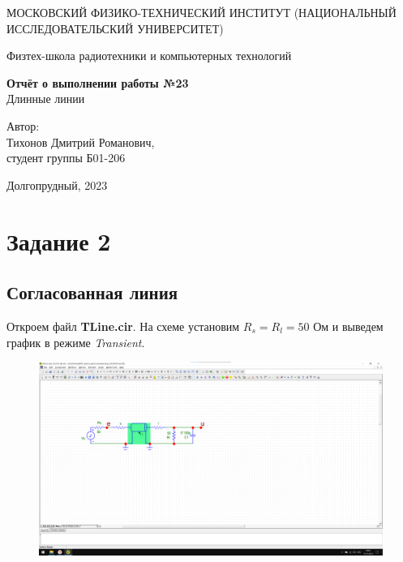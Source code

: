 \documentclass[a4paper, 12pt]{article}
\begin{document}
    \begin{titlepage}
	\begin{center}
            {\large МОСКОВСКИЙ ФИЗИКО-ТЕХНИЧЕСКИЙ ИНСТИТУТ (НАЦИОНАЛЬНЫЙ ИССЛЕДОВАТЕЛЬСКИЙ УНИВЕРСИТЕТ)}
	\end{center}
 
	\begin{center}
		{\large Физтех-школа радиотехники и компьютерных технологий}
	\end{center}
	
	\vspace{8cm}
	{\LARGE
		\begin{center}
                {\bf Отчёт о выполнении работы №23}\\
                Длинные линии
		\end{center}
	}
	\vspace{5cm}
	\begin{flushright}
		{\Large Автор:\\ Тихонов Дмитрий Романович, \\
			\vspace{0.2cm}
			студент группы Б01-206}
	\end{flushright}
	\vspace{5cm}
	\begin{center}
		\Large Долгопрудный, 2023
	\end{center}
    \end{titlepage}


    \section*{Задание 2}

    \subsection*{Согласованная линия}

     Откроем файл \textbf{TLine.cir}. На схеме установим $R_s = R_l = 50$ Ом и выведем график в режиме \textit{Transient}.

    \begin{figure}[H]
        \centering
        \includegraphics[width = 14 cm]{images/TLine.png}
    \end{figure}
\end{document}
